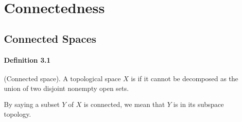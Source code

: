 \documentclass{article}
\numberwithin{equation}{section}
\theoremstyle{plain}
\theoremstyle{definition}
\begin{document}
\newpage
\section{Connectedness}
\subsection{Connected Spaces}
\paragraph{Definition 3.1\label{def:3.1}} (Connected space). A topological space $X$ is  if it cannot be decomposed as the union of two disjoint nonempty open sets. 

By saying a subset $Y$ of $X$ is connected, we mean that $Y$ is  in its subspace topology.
\end{document}

